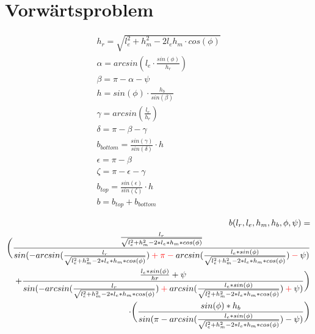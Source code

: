 \documentclass[12pt,a4paper]{article}
\author{Vera Loeser}
\begin{document}
	\section{Vorw\"artsproblem}

\begin{align*}
h_r = \sqrt{l_e^2 + h_m^2 - 2l_eh_m\cdot cos(\phi)}\\
\alpha =arcsin\left(l_e \cdot \frac{sin(\phi)}{h_r}\right)\\
\beta = \pi - \alpha - \psi\\
h = sin(\phi) \cdot \frac{h_b}{sin(\beta)}\\
\gamma = arcsin(\frac{l_r}{h_r})\\
\delta = \pi - \beta - \gamma\\
b_{bottom} = \frac{sin(\gamma)}{sin(\delta)}\cdot h\\
\epsilon = \pi - \beta\\
\zeta = \pi - \epsilon - \gamma\\
b_{top} = \frac{sin(\epsilon)}{sin(\zeta)}\cdot h\\
b = b_{top} + b_{bottom}
\end{align*}

\begin{align*}
\begin{split}
b (l_r, l_e, h_m, h_b, \phi, \psi) =\\ \bigg(\frac{\frac{l_r}{\sqrt{l_e ^2 + h_m^2 - 2*l_e*h_m * cos(\phi)}}}{sin(-arcsin(\frac{l_r}{\sqrt{l_e ^2 + h_m^2 - 2*l_e*h_m * cos(\phi)}})\color{red} + \pi - \color{black} arcsin(\frac{l_e * sin(\phi)}{\sqrt{l_e ^2 + h_m^2 - 2*l_e*h_m * cos(\phi)}}) \color{red} - \color{black} \psi)}\\ 
+ \frac{\frac{l_e*sin(\phi)}{hr}+\psi}{sin(-arcsin(\frac{l_r}{\sqrt{l_e ^2 + h_m^2 - 2*l_e*h_m * cos(\phi)}}) \color{red}+\color{black} arcsin(\frac{l_e * sin(\phi)}{\sqrt{l_e ^2 + h_m^2 - 2*l_e*h_m * cos(\phi)}}) \color{red} + \color{black} \psi)}\bigg)\\
\cdot\bigg(\frac{sin(\phi) * h_b}{sin(\pi - arcsin(\frac{l_e * sin(\phi)}{\sqrt{l_e ^2 + h_m^2 - 2*l_e*h_m * cos(\phi)}}) - \psi)}\bigg)
\end{split}
\end{align*}
\end{document}
